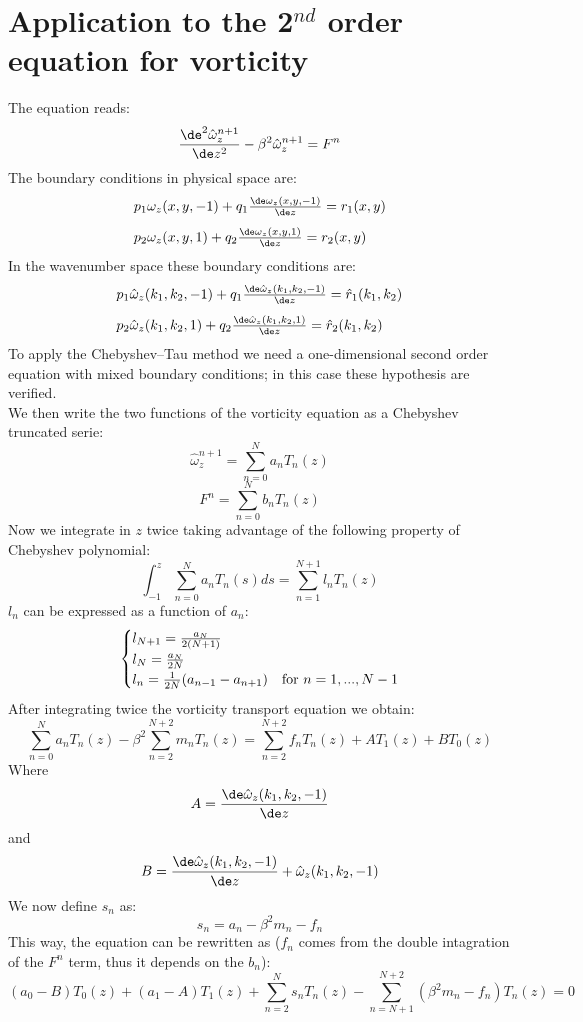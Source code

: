 \section{Application to the 2$^{nd}$ order equation for vorticity}
The equation reads:
\[
\frac{\de^2 \hat\omega_z^{n+1}}{\de z^2}-\beta^2\hat\omega_z^{n+1}=F^n
\]
The boundary conditions in physical space are:
\[
\begin{array}{l}
p_1\omega_z(x,y,-1)+q_1\frac{\de \omega_z(x,y,-1)}{\de z}=r_1(x,y)\\[2ex]
p_2\omega_z(x,y,1)+q_2\frac{\de \omega_z(x,y,1)}{\de z}=r_2(x,y)\\
\end{array}
\]
In the wavenumber space these boundary conditions are:
\[
\begin{array}{l}
p_1\hat\omega_z(k_1,k_2,-1)+q_1\frac{\de \hat\omega_z(k_1,k_2,-1)}{\de z}=\hat r_1(k_1,k_2)\\[2ex]
p_2\hat\omega_z(k_1,k_2,1)+q_2\frac{\de \hat\omega_z(k_1,k_2,1)}{\de z}=\hat r_2(k_1,k_2)\\
\end{array}
\]
To apply the Chebyshev--Tau method we need a one-dimensional second order equation with mixed boundary conditions; in this case these hypothesis are verified.\\
We then write the two functions of the vorticity equation as a Chebyshev truncated serie:
\[
\hat\omega_z^{n+1}=\sum_{n=0}^N a_nT_n(z)
\]
\[
F^n=\sum_{n=0}^N b_n T_n(z)
\]
Now we integrate in $z$ twice taking advantage of the following property of Chebyshev polynomial:
\[
\int_{-1}^z\sum_{n=0}^N a_nT_n(s)ds=\sum_{n=1}^{N+1}l_n T_n(z)
\]
$l_n$ can be expressed as a function of $a_n$:
\[
\begin{cases}
l_{N+1}=\frac{a_N}{2(N+1)}\\
l_N=\frac{a_{N}}{2N}\\
l_n=\frac{1}{2N}(a_{n-1}-a_{n+1}) &\textnormal{for } n=1,...,N-1
\end{cases}
\]
After integrating twice the vorticity transport equation we obtain:
\[
\sum_{n=0}^N a_n T_n(z)-\beta^2\sum_{n=2}^{N+2} m_nT_n(z)=\sum_{n=2}^{N+2} f_n T_n(z) +AT_1(z)+BT_0(z)
\]
Where 
\[
A=\frac{\de\hat\omega_z(k_1,k_2,-1)}{\de z}
\]
and
\[
B=\frac{\de\hat\omega_z(k_1,k_2,-1)}{\de z}+\hat\omega_z(k_1,k_2,-1)
\]
We now define $s_n$ as:
\[
s_n=a_n-\beta^2m_n-f_n
\]
This way, the equation can be rewritten as ($f_n$ comes from the double intagration of the $F^n$ term, thus it depends on the $b_n$):
\[
(a_0-B)T_0(z)+(a_1-A)T_1(z)+\sum_{n=2}^N s_n T_n(z)-\sum_{n=N+1}^{N+2}\left( \beta^2m_n -f_n \right)T_n(z)=0
\]
